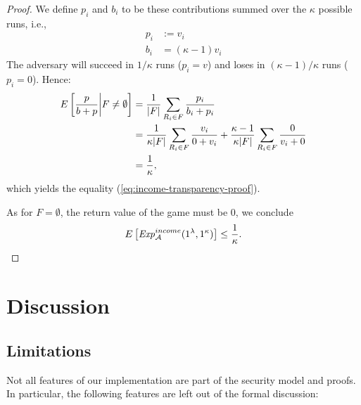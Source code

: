 \begin{proof}
  We define $p_i$ and $b_i$ to be these contributions summed over the $\kappa$ possible
  runs, i.e.,
  \begin{align*}
    p_i &:= v_i\\
    b_i &= (\kappa - 1)v_i
  \end{align*}
  The adversary will succeed in $1/\kappa$ runs ($p_i=v$) and loses in
  $(\kappa-1)/\kappa$ runs ($p_i=0$). Hence:
  \begin{align*}
    E\left[{\frac{p}{b + p}} \middle| F \neq \emptyset\right]
        &= \frac{1}{|F|} \sum_{R_i\in F} {p_i \over b_i + p_i} \\
        &= \frac{1}{\kappa |F|} \sum_{R_i\in F} {\frac{v_i}{0 + v_i}} + \frac{\kappa-1}{\kappa |F|} \sum_{R_i \in F} {\frac{0}{v_i + 0}} \\
        &= {\frac{1}{\kappa}},
  \end{align*}
  which yields the equality (\ref{eq:income-transparency-proof}).

As for $F = \emptyset$, the return value of the game must be $0$, we conclude
\begin{equation*}
  E\left[\mathit{Exp}_{\cal A}^{income}(1^\lambda, 1^\kappa)\right] \le {\frac{1}{\kappa}}.
\end{equation*}

\end{proof}

\section{Discussion}

\subsection{Limitations}
Not all features of our implementation are part of the security model and proofs.
In particular, the following features are left out of the formal discussion:

